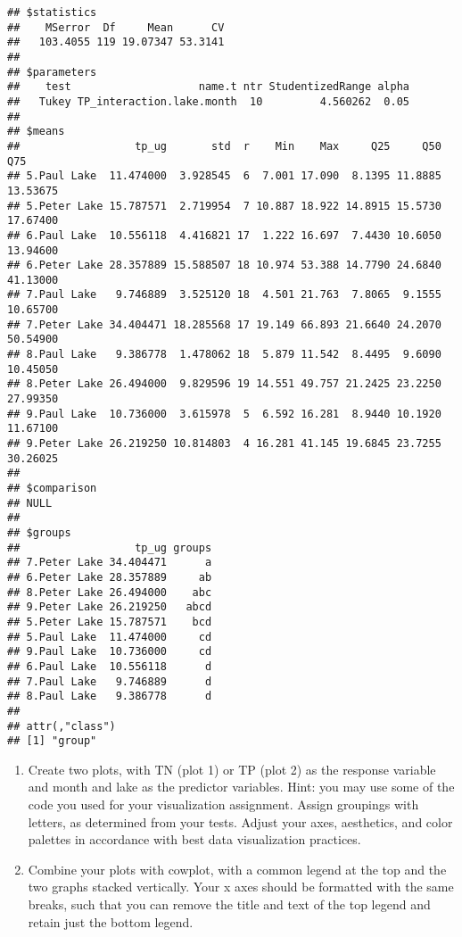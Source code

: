 \documentclass[]{article}
\begin{document}
\begin{verbatim}
## $statistics
##    MSerror  Df     Mean      CV
##   103.4055 119 19.07347 53.3141
## 
## $parameters
##    test                    name.t ntr StudentizedRange alpha
##   Tukey TP_interaction.lake.month  10         4.560262  0.05
## 
## $means
##                  tp_ug       std  r    Min    Max     Q25     Q50      Q75
## 5.Paul Lake  11.474000  3.928545  6  7.001 17.090  8.1395 11.8885 13.53675
## 5.Peter Lake 15.787571  2.719954  7 10.887 18.922 14.8915 15.5730 17.67400
## 6.Paul Lake  10.556118  4.416821 17  1.222 16.697  7.4430 10.6050 13.94600
## 6.Peter Lake 28.357889 15.588507 18 10.974 53.388 14.7790 24.6840 41.13000
## 7.Paul Lake   9.746889  3.525120 18  4.501 21.763  7.8065  9.1555 10.65700
## 7.Peter Lake 34.404471 18.285568 17 19.149 66.893 21.6640 24.2070 50.54900
## 8.Paul Lake   9.386778  1.478062 18  5.879 11.542  8.4495  9.6090 10.45050
## 8.Peter Lake 26.494000  9.829596 19 14.551 49.757 21.2425 23.2250 27.99350
## 9.Paul Lake  10.736000  3.615978  5  6.592 16.281  8.9440 10.1920 11.67100
## 9.Peter Lake 26.219250 10.814803  4 16.281 41.145 19.6845 23.7255 30.26025
## 
## $comparison
## NULL
## 
## $groups
##                  tp_ug groups
## 7.Peter Lake 34.404471      a
## 6.Peter Lake 28.357889     ab
## 8.Peter Lake 26.494000    abc
## 9.Peter Lake 26.219250   abcd
## 5.Peter Lake 15.787571    bcd
## 5.Paul Lake  11.474000     cd
## 9.Paul Lake  10.736000     cd
## 6.Paul Lake  10.556118      d
## 7.Paul Lake   9.746889      d
## 8.Paul Lake   9.386778      d
## 
## attr(,"class")
## [1] "group"
\end{verbatim}

\begin{enumerate}
\def\labelenumi{\arabic{enumi}.}
\setcounter{enumi}{6}
\item
  Create two plots, with TN (plot 1) or TP (plot 2) as the response
  variable and month and lake as the predictor variables. Hint: you may
  use some of the code you used for your visualization assignment.
  Assign groupings with letters, as determined from your tests. Adjust
  your axes, aesthetics, and color palettes in accordance with best data
  visualization practices.
\item
  Combine your plots with cowplot, with a common legend at the top and
  the two graphs stacked vertically. Your x axes should be formatted
  with the same breaks, such that you can remove the title and text of
  the top legend and retain just the bottom legend.
\end{enumerate}
\end{document}
